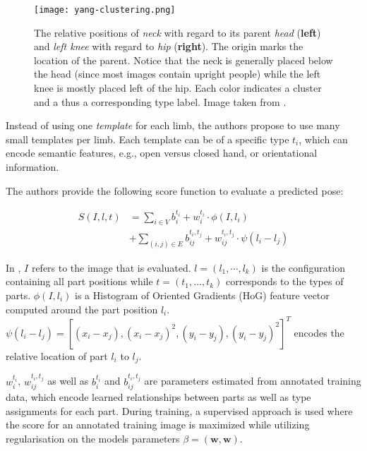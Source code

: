 \begin{figure}[htb!]
    \centering
    \texttt{[image: yang-clustering.png]}
    \caption{The relative positions of \textit{neck} with regard to     its parent \textit{head} (\textbf{left}) and \textit{left knee} with regard to \textit{hip} (\textbf{right}). The origin marks the location of the parent. Notice that the neck is generally placed below the head (since most images contain upright people) while the left knee is mostly placed left of the hip. Each color indicates a cluster and a thus a corresponding type label. Image taken from \cite{yang_articulated_2011}.}
    \label{fig:yang-clustering}
\end{figure}

Instead of using one \textit{template} for each limb, the authors propose to use many small templates per limb.
Each template can be of a specific type $t_i$, which can encode semantic features, e.g., open versus closed hand, or orientational information.

The authors provide the following score function to evaluate a predicted pose:

\begin{equation}
    \label{eq:yang-score}
    \begin{split}
        S(I, l, t) 
        &= \sum_{i \in V} b_i^{t_i} + w_i^{t_i} \cdot \phi(I, l_i) \\
        &+ \sum_{(i,j) \in E} b_{ij}^{t_i, t_j} + w_{ij}^{t_i, t_j} \cdot \psi(l_i - l_j)
    \end{split}
\end{equation}

In , $I$ refers to the image that is evaluated.
$l = (l_1, \cdots, l_k)$ is the configuration containing all part positions while $t = (t_1, \dots, t_k)$ corresponds to the types of parts.
$\phi(I, l_i)$ is a Histogram of Oriented Gradients (HoG) feature vector \cite{dalal_histograms_2005} computed around the part position $l_i$.
$\psi(l_i - l_j) = [(x_i - x_j), (x_i - x_j)^2, (y_i - y_j), (y_i - y_j)^2]^T$ encodes the relative location of part $l_i$ to $l_j$.

$w_i^{t_i}$, $w_{ij}^{t_i, t_j}$ as well as $b_i^{t_i}$ and $b_{ij}^{t_i, t_j}$ are parameters estimated from annotated training data, which encode learned relationships between parts as well as type assignments for each part.
During training, a supervised approach is used where the score for an annotated training image is maximized while utilizing regularisation on the models parameters $\beta = (\bm{w}, \bm{w})$.

